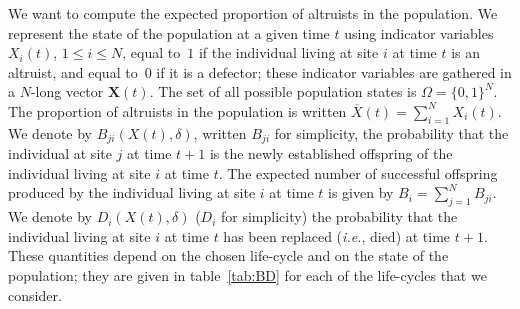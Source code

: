 \documentclass[11pt, letterpaper]{article}
\newcommand{\ie}{\textit{i.e.}}
\newcommand{\selstr}{\delta}
\begin{document}
We want to compute the expected proportion of altruists in the population. We represent the state of the population at a given time $t$ using indicator variables $X_i(t)$, $1\leq i \leq N$, equal to~$1$ if the individual living at site $i$ at time $t$ is an altruist, and equal to~$0$ if it is a defector; these indicator variables are gathered in a $N$-long vector $\mathbf{X}(t)$. The set of all possible population states is $\Omega = \{0,1\}^N$. The proportion of altruists in the population is written $\overline{X}(t) = \sum_{i=1}^N X_i(t)$. We denote by $B_{ji}(X(t), \selstr)$, written $B_{ji}$ for simplicity, the probability that the individual at site $j$ at time $t+1$ is the newly established offspring of the individual living at site $i$ at time $t$. The expected number of successful offspring produced by the individual living at site $i$ at time $t$ is given by $B_i = \sum_{j=1}^N B_{ji}$. We denote by $D_{i}(X(t), \selstr)$ ($D_i$ for simplicity) the probability that the individual living at site $i$ at time $t$ has been replaced (\ie, died) at time $t+1$. These quantities depend on the chosen life-cycle and on the state of the population; they are given in table~\ref{tab:BD} for each of the life-cycles that we consider. 
\end{document}
